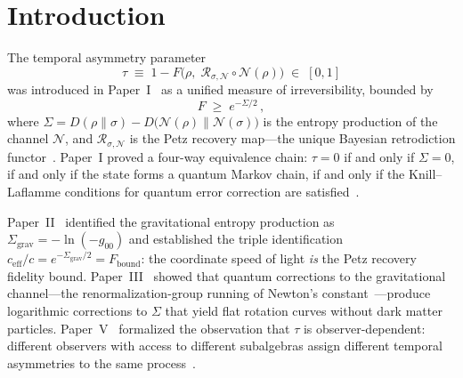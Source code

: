 \documentclass[prd,twocolumn,superscriptaddress,longbibliography,floatfix]{revtex4-2}
\newcommand{\Petz}{\mathcal{R}}
\newcommand{\chan}{\mathcal{N}}
\newcommand{\KL}{D}
\newcommand{\tauasym}{\tau}
\newcommand{\ceff}{c_{\mathrm{eff}}}
\newcommand{\Sgrav}{\Sigma_{\mathrm{grav}}}
\newcommand{\Fbound}{F_{\mathrm{bound}}}
\begin{document}
\maketitle

\section{Introduction}
\label{sec:intro}

The temporal asymmetry parameter
\begin{equation}
\tauasym \;\equiv\; 1 - F\!\bigl(\rho,\;
\Petz_{\sigma,\chan}\!\circ\!\chan(\rho)\bigr)
\;\in\; [0,1]
\label{eq:tau_def}
\end{equation}
was introduced in Paper~I~\cite{Paper1} as a unified measure
of irreversibility, bounded by
\begin{equation}
F \;\geq\; e^{-\Sigma/2}\,,
\label{eq:JRSWW_bound}
\end{equation}
where $\Sigma = \KL(\rho\|\sigma) -
\KL\!\bigl(\chan(\rho)\|\chan(\sigma)\bigr)$ is the entropy
production of the channel $\chan$, and $\Petz_{\sigma,\chan}$
is the Petz recovery map---the unique Bayesian retrodiction
functor~\cite{Parzygnat2023,Petz1988}.
Paper~I proved a four-way equivalence chain:
$\tauasym = 0$ if and only if $\Sigma = 0$, if and only if the
state forms a quantum Markov chain, if and only if the
Knill--Laflamme conditions for quantum error correction are
satisfied~\cite{Paper1}.

Paper~II~\cite{Paper2} identified the gravitational entropy
production as $\Sgrav = -\ln(-g_{00})$ and established the
triple identification $\ceff/c = e^{-\Sgrav/2} = \Fbound$:
the coordinate speed of light \emph{is} the Petz recovery
fidelity bound.  Paper~III~\cite{Paper3} showed that
quantum corrections to the gravitational channel---the
renormalization-group running of Newton's
constant~\cite{Kumar2025}---produce logarithmic corrections
to $\Sigma$ that yield flat rotation curves without dark matter
particles.  Paper~V~\cite{Paper5} formalized the observation
that $\tauasym$ is observer-dependent:
different observers with access to different subalgebras
assign different temporal asymmetries to the same
process~\cite{BassoCeleri2025,DeVuyst2025}.
\end{document}
